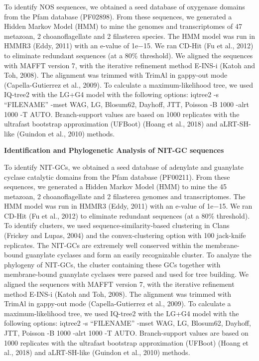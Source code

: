 \documentclass[
  10pt,
  onecolumn]{article}
\begin{document}
To identify NOS sequences, we obtained a seed database of oxygenase
domains from the Pfam database (PF02898). From these sequences, we
generated a Hidden Markov Model (HMM) to mine the genomes and
transcriptomes of 47 metazoan, 2 choanoflagellate and 2 filasterea
species. The HMM model was run in HMMR3 (Eddy, 2011) with an e-value of
1e−15. We ran CD-Hit (Fu et al., 2012) to eliminate redundant sequences
(at a 80\% threshold). We aligned the sequences with MAFFT version 7,
with the iterative refinement method E-INS-i (Katoh and Toh, 2008). The
alignment was trimmed with TrimAl in gappy-out mode (Capella-Gutierrez
et al., 2009). To calculate a maximum-likelihood tree, we used IQ-tree2
with the LG+G4 model with the following options: iqtree2 -s ``FILENAME''
-mset WAG, LG, Blosum62, Dayhoff, JTT, Poisson -B 1000 -alrt 1000 -T
AUTO. Branch-support values are based on 1000 replicates with the
ultrafast bootstrap approximation (UFBoot) (Hoang et al., 2018) and
aLRT-SH-like (Guindon et al., 2010) methods.

\textbf{Identification and Phylogenetic Analysis of NIT-GC sequences}

To identify NIT-GCs, we obtained a seed database of adenylate and
guanylate cyclase catalytic domains from the Pfam database (PF00211).
From these sequences, we generated a Hidden Markov Model (HMM) to mine
the 45 metazoan, 2 choanoflagellate and 2 filasterea genomes and
transcriptomes. The HMM model was run in HMMR3 (Eddy, 2011) with an
e-value of 1e−15. We ran CD-Hit (Fu et al., 2012) to eliminate redundant
sequences (at a 80\% threshold). To identify clusters, we used
sequence-similarity-based clustering in Clans (Frickey and Lupas, 2004)
and the convex-clustering option with 100 jack-knife replicates. The
NIT-GCs are extremely well conserved within the membrane-bound guanylate
cyclases and form an easily recognizable cluster. To analyze the
phylogeny of NIT-GCs, the cluster containing these GCs together with
membrane-bound guanylate cyclases were parsed and used for tree
building. We aligned the sequences with MAFFT version 7, with the
iterative refinement method E-INS-i (Katoh and Toh, 2008). The alignment
was trimmed with TrimAl in gappy-out mode (Capella-Gutierrez et al.,
2009). To calculate a maximum-likelihood tree, we used IQ-tree2 with the
LG+G4 model with the following options: iqtree2 -s ``FILENAME'' -mset
WAG, LG, Blosum62, Dayhoff, JTT, Poisson -B 1000 -alrt 1000 -T AUTO.
Branch-support values are based on 1000 replicates with the ultrafast
bootstrap approximation (UFBoot) (Hoang et al., 2018) and aLRT-SH-like
(Guindon et al., 2010) methods.
\end{document}
